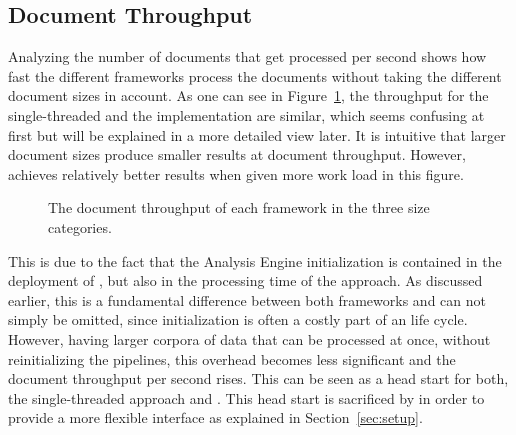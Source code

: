 \subsection{Document Throughput}
Analyzing the number of documents that get processed per second shows how fast the different frameworks process the documents without taking the different document sizes in account. As one can see in Figure~\ref{fig:result:throughput}, the throughput for the single-threaded \uima{} and the \uimaas{} implementation are similar, which seems confusing at first but will be explained in a more detailed view later. It is intuitive that larger document sizes produce smaller results at document throughput. However, \spark{} achieves relatively better results when given more work load in this figure.
\begin{figure}[!htb]
	\centering
	\resizebox{1.\linewidth}{!}{\small}
	\caption[The document throughput of each framework in the three size categories.]{The document throughput of each framework in the three size categories.}
	\label{fig:result:throughput}
\end{figure}
This is due to the fact that the Analysis Engine initialization is contained in the deployment of \uimaas{}, but also in the processing time of the \spark{} approach. As discussed earlier, this is a fundamental difference between both frameworks and can not simply be omitted, since initialization is often a costly part of an \anen{} life cycle. However, having larger corpora of data that can be processed at once, without reinitializing the pipelines, this overhead becomes less significant and the document throughput per second rises. This can be seen as a head start for both, the single-threaded approach and \uimaas{}. This head start is sacrificed by \spark{} in order to provide a more flexible interface as explained in Section~\ref{sec:setup}.

